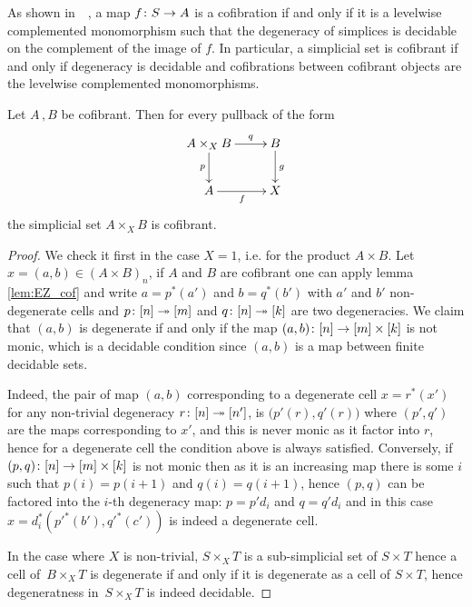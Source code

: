 \documentclass[reqno,10pt,a4paper,oneside,draft]{amsart}
\begin{document}
As shown in~~\cite[Proposition 5.1.7]{henry2018wms}, a map $f \colon S \to A$ is a cofibration if and only if it is a levelwise complemented monomorphism such that the degeneracy of simplices is decidable on the complement of the image of $f$. In particular, a simplicial set is cofibrant if and only if degeneracy is decidable and cofibrations between cofibrant objects are the levelwise complemented monomorphisms.






 






\begin{lemma}\label{lem:cofibrant_fiber_product}
Let $A \, , B$ be cofibrant. Then for every pullback of the form
\[
\xymatrix{
A \times_X B \ar[r]^-{q} \ar[d]_-{p} & B \ar[d]^g \\
A \ar[r]_f & X }
\]
the simplicial set $A \times_{X} B$ is cofibrant.
\end{lemma}

\begin{proof}
We check it first in the case $X = 1$, i.e. for the product $A \times B$. Let $x = (a,b) \in (A \times B)_n$, if $A$ and $B$ are cofibrant one can apply lemma \ref{lem:EZ_cof} and write $a = p^*(a')$ and $b = q^*(b')$ with $a'$ and $b'$ non-degenerate cells and $p \colon [n] \twoheadrightarrow [m]$ and $q \colon [n] \twoheadrightarrow [k]$ are two degeneracies. We claim that $(a,b)$ is degenerate if and only if the map $(a ,b )  \colon [n] \rightarrow [m] \times [k]$ is not monic, which is a decidable condition since $(a,b)$ is a map between finite decidable sets.

Indeed, the pair of map $(a,b)$ corresponding to a degenerate cell $x=r^*(x')$ for any non-trivial degeneracy $r \colon [n] \twoheadrightarrow [n']$, is  $\big( p'(r),q'(r) \big)$ where $(p',q')$ are the maps corresponding to $x'$, and this is never monic as it factor into $r$, hence for a degenerate cell the condition above is always satisfied. Conversely, if $(p,q)\colon [n] \rightarrow [m] \times [k]$ is not monic then as it is an increasing map there is some $i$ such that $p(i)=p(i+1)$ and $q(i)=q(i+1)$, hence $(p,q)$ can be factored into the $i$-th degeneracy map: $p=p' d_i$ and $q=q' d_i$ and in this case $x= d_i^* (p'^*(b'),q'^*(c'))$ is indeed a degenerate cell.


In the case where $X$ is non-trivial, $S \times_X T$ is a sub-simplicial set of $S \times T$ hence a cell of~$B \times_X T$ is degenerate if and only if it is degenerate as a cell of $S \times T$, hence degeneratness 
in~$S \times_X T$ is indeed decidable. 
\end{proof}
\end{document}
